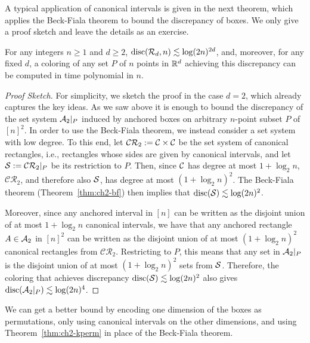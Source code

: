 
A typical application of canonical intervals is given in the next theorem, which applies the Beck-Fiala theorem to bound the discrepancy of boxes. We only give a proof sketch and leave the details as an exercise. 

\begin{theorem}\label{thm:ch2-bftusnady}
  For any integers \(n \ge 1\) and \(d \ge 2\),
  \(\disc(\RR_d, n) \lesssim \log(2n)^{2d}\), and, moreover, for any
  fixed \(d\), a coloring of any set \(P\) of \(n\) points in \(\R^d\)
  achieving this discrepancy can be computed in time polynomial in
  \(n\).
\end{theorem}
\begin{proof}[Proof Sketch]
    For simplicity, we sketch the proof in the case $d=2$, which already captures the key ideas.
    As we saw above it is enough to bound the discrepancy of the set system $\AA_2|_P$ induced by anchored boxes on arbitrary $n$-point subset $P$ of $[n]^2$. In order to use the Beck-Fiala theorem, we instead consider a set system with low degree. To this end, let $\mathcal{CR}_2 := \CC\times \CC$ be the set system of canonical rectangles, i.e., rectangles whose sides are given by canonical intervals, and let $\SS := \mathcal{CR}_2|_P$ be its restriction to $P$. Then, since $\CC$ has degree at most $1+\log_2 n$, $\mathcal{CR}_2$, and therefore also $\SS$, has degree at most $(1+\log_2 n)^2$. The Beck-Fiala theorem (Theorem~\ref{thm:ch2-bf}) then implies that $\disc(\SS) \lesssim \log(2n)^2$.
    
    Moreover, since any anchored interval in $[n]$ can be written as the disjoint union of at most $1+\log_2 n$ canonical intervals, we have that any anchored rectangle $A \in \AA_2$ in $[n]^2$ can be written as the disjoint union of at most $(1+\log_2 n)^2$ canonical rectangles from $\mathcal{CR}_2$. Restricting to $P$, this means that any set in $\AA_2|_P$ is the disjoint union of at most $(1+\log_2 n)^2$ sets from $\SS$. Therefore, the coloring that achieves discrepancy $\disc(\SS) \lesssim \log(2n)^2$ also gives $\disc(\AA_2|_P) \lesssim \log(2n)^4$. 
\end{proof}

We can get a better bound by encoding one dimension of the boxes as permutations, only using canonical intervals on the other dimensions, and using Theorem~\ref{thm:ch2-kperm} in place of the Beck-Fiala theorem. 

